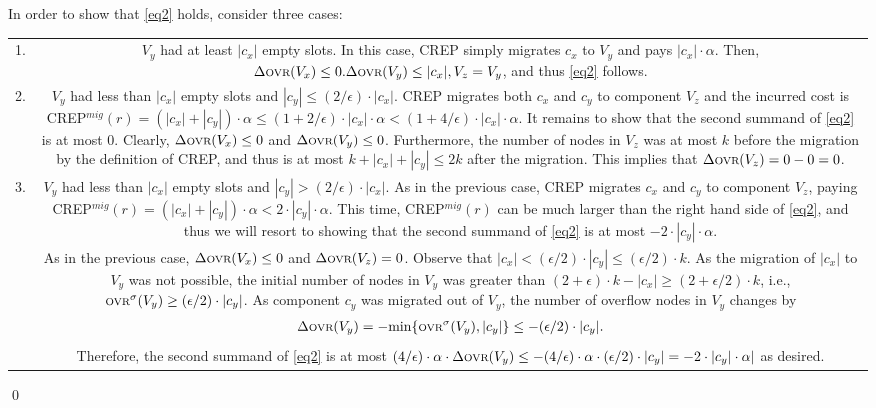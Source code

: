 \documentclass[xcolor=dvipsnames, tikz, 11pt]{article}
\newcommand{\crep}{C{\scriptsize REP}}
\newcommand{\ovr}{\text{\scriptsize OVR}}
\theoremstyle{definition}
\begin{document}
In order to show that \ref{eq2} holds, consider three cases:

\begin{tabularx}{\textwidth}{cC}
	1. &$V_y$ had at least $|c_x|$ empty slots. In this case, \crep{} simply migrates $c_x$ to $V_y$ and pays $|c_x|\cdot\alpha$. Then, $\Delta\ovr{}(V_x)\leq0. \Delta\ovr{}(V_y)\leq|c_x|, V_z=V_y$, and thus \ref{eq2} follows.\\
	
	2. &$V_y$ had less than $|c_x|$ empty slots and $|c_y|\leq(2/\epsilon)\cdot|c_x|$. \crep{} migrates both $c_x$ and $c_y$ to component $V_z$ and the incurred cost is \crep{}$^{mig}(r)=(|c_x|+|c_y|)\cdot\alpha\leq(1+2/\epsilon)\cdot|c_x|\cdot\alpha<(1+4/\epsilon)\cdot|c_x|\cdot\alpha$. It remains to show that the second summand of \ref{eq2} is at most 0. Clearly, $\Delta\ovr{}(V_x)\leq0$ and $\Delta\ovr{}(V_y)\leq0$. Furthermore, the number of nodes in $V_z$ was at most $k$ before the migration by the definition of \crep{}, and thus is at most $k+|c_x|+|c_y|\leq 2k$ after the migration. This implies that $\Delta\ovr{}(V_z)=0-0=0$.\\
	3. &$V_y$ had less than $|c_x|$ empty slots and $|c_y|>(2/\epsilon)\cdot|c_x|$. As in the previous case, \crep{} migrates $c_x$ and $c_y$ to component $V_z$, paying \crep{}$^{mig}(r)=(|c_x|+|c_y|)\cdot\alpha<2\cdot|c_y|\cdot\alpha$. This time, \crep{}$^{mig}(r)$ can be much larger than the right hand side of \ref{eq2}, and thus we will resort to showing that the second summand of \ref{eq2} is at most $-2\cdot|c_y|\cdot\alpha$.\\
	
	&As in the previous case, $\Delta\ovr{}(V_x)\leq0$ and $\Delta\ovr{}(V_z)=0$. Observe that $|c_x|<(\epsilon/2)\cdot|c_y|\leq(\epsilon/2)\cdot k$. As the migration of $|c_x|$ to $V_y$ was not possible, the initial number of nodes in $V_y$ was greater than $(2+\epsilon)\cdot k-|c_x|\geq(2+\epsilon/2)\cdot k$, i.e., $\ovr{}^\sigma(V_y)\geq(\epsilon/2)\cdot |c_y|$. As component $c_y$ was migrated out of $V_y$, the number of overflow nodes in $V_y$ changes by
	\begin{align*}
	\Delta\ovr{}(V_y)=-\text{min}\{\ovr{}^\sigma(V_y), |c_y|\}\leq-(\epsilon/2)\cdot|c_y|.
	\end{align*}
	Therefore, the second summand of \ref{eq2} is at most $(4/\epsilon)\cdot\alpha\cdot\Delta\ovr{}(V_y)\leq-(4/\epsilon)\cdot\alpha\cdot(\epsilon/2)\cdot|c_y|=-2\cdot|c_y|\cdot\alpha|$ as desired. \\
	\end{tabularx}\qed
\end{document}
